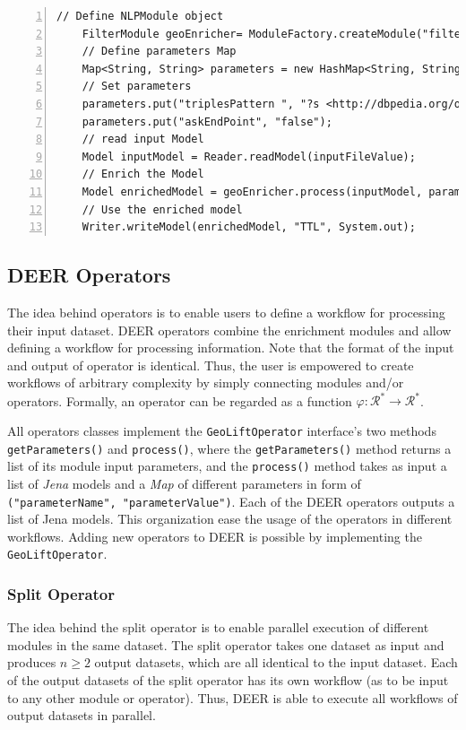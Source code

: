 \documentclass[a4paper,twoside,bibtotoc,abstracton,12pt,BCOR=15mm]{article}
\newcommand{\geolift}{\textsc{DEER}\xspace}
\begin{document}
    \begin{lstlisting}[label=lst:filterModule, float=tp, numbers=left, numberstyle=\tiny, caption = Code fragment to call the \texttt{FilterModule} class.]
    // Define NLPModule object
    FilterModule geoEnricher= ModuleFactory.createModule("filter");
    // Define parameters Map
    Map<String, String> parameters = new HashMap<String, String>();
    // Set parameters
    parameters.put("triplesPattern ", "?s <http://dbpedia.org/ontology/abstract> ?o");
    parameters.put("askEndPoint", "false");
    // read input Model
    Model inputModel = Reader.readModel(inputFileValue);
    // Enrich the Model
    Model enrichedModel = geoEnricher.process(inputModel, parameters);
    // Use the enriched model
    Writer.writeModel(enrichedModel, "TTL", System.out);
    \end{lstlisting}
    
\subsection{\geolift Operators}
The idea behind operators is to enable users to define a workflow for processing their input dataset. 
\geolift operators combine the enrichment modules and allow defining a workflow for processing information.
Note that the format of the input and output of operator is identical. 
Thus, the user is empowered to create workflows of arbitrary complexity by simply connecting modules and/or operators.
Formally, an operator can be regarded as a function $\varphi: \mathcal{R}^* \rightarrow \mathcal{R}^*$.

  All operators classes implement the \texttt{GeoLiftOperator} interface's two methods \texttt{getParameters()} and \texttt{process()},
 where the \texttt{getParameters()} method returns a list of its module input parameters,
 and the \texttt{process()} method takes as input a list of \emph{Jena} models and a \emph{Map} of different parameters in form of \texttt{("parameterName", "parameterValue")}.
 Each of the \geolift operators outputs a list of Jena models.
 This organization ease the usage of the operators in different workflows.
 Adding new operators to \geolift is possible by implementing the \texttt{GeoLiftOperator}.

\subsubsection{Split Operator}
The idea behind the split operator is to enable parallel execution of different modules in the same dataset. 
The split operator takes one dataset as input and produces $n \geq 2$ output datasets, which are all identical to the input dataset.
Each of the output datasets of the split operator has its own workflow (as to be input to any other module or operator).
Thus, \geolift is able to execute all workflows of output datasets in parallel. 
\end{document}
